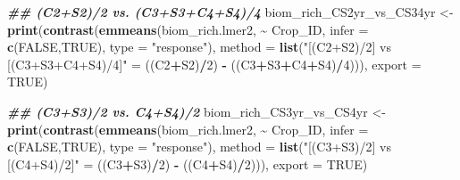 \documentclass[
]{article}
\newenvironment{Shaded}{\begin{snugshade}}{\end{snugshade}}
\newcommand{\AttributeTok}[1]{\textcolor[rgb]{0.13,0.29,0.53}{#1}}
\newcommand{\ConstantTok}[1]{\textcolor[rgb]{0.56,0.35,0.01}{#1}}
\newcommand{\DecValTok}[1]{\textcolor[rgb]{0.00,0.00,0.81}{#1}}
\newcommand{\DocumentationTok}[1]{\textcolor[rgb]{0.56,0.35,0.01}{\textbf{\textit{#1}}}}
\newcommand{\FunctionTok}[1]{\textcolor[rgb]{0.13,0.29,0.53}{\textbf{#1}}}
\newcommand{\NormalTok}[1]{#1}
\newcommand{\OtherTok}[1]{\textcolor[rgb]{0.56,0.35,0.01}{#1}}
\newcommand{\SpecialCharTok}[1]{\textcolor[rgb]{0.81,0.36,0.00}{\textbf{#1}}}
\newcommand{\StringTok}[1]{\textcolor[rgb]{0.31,0.60,0.02}{#1}}
\begin{document}
\begin{Shaded}
\begin{Highlighting}[]
\DocumentationTok{\#\# (C2+S2)/2 vs. (C3+S3+C4+S4)/4}
\NormalTok{biom\_rich\_CS2yr\_vs\_CS34yr }\OtherTok{\textless{}{-}} \FunctionTok{print}\NormalTok{(}\FunctionTok{contrast}\NormalTok{(}\FunctionTok{emmeans}\NormalTok{(biom\_rich.lmer2, }\SpecialCharTok{\textasciitilde{}}\NormalTok{ Crop\_ID,}
                                                    \AttributeTok{infer =} \FunctionTok{c}\NormalTok{(}\ConstantTok{FALSE}\NormalTok{,}\ConstantTok{TRUE}\NormalTok{),}
                                                    \AttributeTok{type =} \StringTok{"response"}\NormalTok{),}
                                            \AttributeTok{method =} \FunctionTok{list}\NormalTok{(}\StringTok{"[(C2+S2)/2] vs [(C3+S3+C4+S4)/4]"} \OtherTok{=}
\NormalTok{                                                            ((C2}\SpecialCharTok{+}\NormalTok{S2)}\SpecialCharTok{/}\DecValTok{2}\NormalTok{) }\SpecialCharTok{{-}}\NormalTok{ ((C3}\SpecialCharTok{+}\NormalTok{S3}\SpecialCharTok{+}\NormalTok{C4}\SpecialCharTok{+}\NormalTok{S4)}\SpecialCharTok{/}\DecValTok{4}\NormalTok{))),}
                                   \AttributeTok{export =} \ConstantTok{TRUE}\NormalTok{)}

\DocumentationTok{\#\# (C3+S3)/2 vs. C4+S4)/2}
\NormalTok{biom\_rich\_CS3yr\_vs\_CS4yr }\OtherTok{\textless{}{-}} \FunctionTok{print}\NormalTok{(}\FunctionTok{contrast}\NormalTok{(}\FunctionTok{emmeans}\NormalTok{(biom\_rich.lmer2, }\SpecialCharTok{\textasciitilde{}}\NormalTok{ Crop\_ID,}
                                                   \AttributeTok{infer =} \FunctionTok{c}\NormalTok{(}\ConstantTok{FALSE}\NormalTok{,}\ConstantTok{TRUE}\NormalTok{),}
                                                   \AttributeTok{type =} \StringTok{"response"}\NormalTok{),}
                                           \AttributeTok{method =} \FunctionTok{list}\NormalTok{(}\StringTok{"[(C3+S3)/2] vs [(C4+S4)/2]"} \OtherTok{=} 
\NormalTok{                                                           ((C3}\SpecialCharTok{+}\NormalTok{S3)}\SpecialCharTok{/}\DecValTok{2}\NormalTok{) }\SpecialCharTok{{-}}\NormalTok{ ((C4}\SpecialCharTok{+}\NormalTok{S4)}\SpecialCharTok{/}\DecValTok{2}\NormalTok{))),}
                                  \AttributeTok{export =} \ConstantTok{TRUE}\NormalTok{)}


\end{Highlighting}
\end{Shaded}
\end{document}

